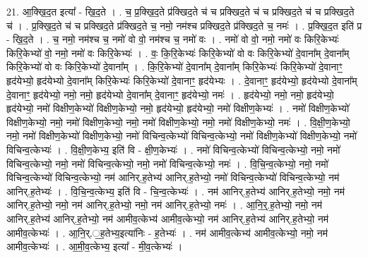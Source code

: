 \documentclass[17pt]{extarticle}
\begin{document}
21. आ॒क्खि॒द॒त इत्या᳚ - खि॒द॒ते । . च॒ प्र॒क्खि॒द॒ते प्र॑क्खिद॒ते च॑ च प्रक्खिद॒ते च॑ च प्रक्खिद॒ते च॑ च प्रक्खिद॒ते च॑ । . प्र॒क्खि॒द॒ते च॑ च प्रक्खिद॒ते प्र॑क्खिद॒ते च॒ नमो॒ नम॑श्च प्रक्खिद॒ते प्र॑क्खिद॒ते च॒ नमः॑ । . प्र॒क्खि॒द॒त इति॑ प्र - खि॒द॒ते । . च॒ नमो॒ नम॑श्च च॒ नमो॑ वो वो॒ नम॑श्च च॒ नमो॑ वः । . नमो॑ वो वो॒ नमो॒ नमो॑ वः किरि॒केभ्यः॑ किरि॒केभ्यो॑ वो॒ नमो॒ नमो॑ वः किरि॒केभ्यः॑ । . वः॒ कि॒रि॒केभ्यः॑ किरि॒केभ्यो॑ वो वः किरि॒केभ्यो॑ दे॒वाना᳚म् दे॒वाना᳚म् किरि॒केभ्यो॑ वो वः किरि॒केभ्यो॑ दे॒वाना᳚म् । . कि॒रि॒केभ्यो॑ दे॒वाना᳚म् दे॒वाना᳚म् किरि॒केभ्यः॑ किरि॒केभ्यो॑ दे॒वानाꣳ॒॒ हृद॑येभ्यो॒ हृद॑येभ्यो दे॒वाना᳚म् किरि॒केभ्यः॑ किरि॒केभ्यो॑ दे॒वानाꣳ॒॒ हृद॑येभ्यः । . दे॒वानाꣳ॒॒ हृद॑येभ्यो॒ हृद॑येभ्यो दे॒वाना᳚म् दे॒वानाꣳ॒॒ हृद॑येभ्यो॒ नमो॒ नमो॒ हृद॑येभ्यो दे॒वाना᳚म् दे॒वानाꣳ॒॒ हृद॑येभ्यो॒ नमः॑ । . हृद॑येभ्यो॒ नमो॒ नमो॒ हृद॑येभ्यो॒ हृद॑येभ्यो॒ नमो॑ विक्षीण॒केभ्यो॑ विक्षीण॒केभ्यो॒ नमो॒ हृद॑येभ्यो॒ हृद॑येभ्यो॒ नमो॑ विक्षीण॒केभ्यः॑ । . नमो॑ विक्षीण॒केभ्यो॑ विक्षीण॒केभ्यो॒ नमो॒ नमो॑ विक्षीण॒केभ्यो॒ नमो॒ नमो॑ विक्षीण॒केभ्यो॒ नमो॒ नमो॑ विक्षीण॒केभ्यो॒ नमः॑ । . वि॒क्षी॒ण॒केभ्यो॒ नमो॒ नमो॑ विक्षीण॒केभ्यो॑ विक्षीण॒केभ्यो॒ नमो॑ विचिन्व॒त्केभ्यो॑ विचिन्व॒त्केभ्यो॒ नमो॑ विक्षीण॒केभ्यो॑ विक्षीण॒केभ्यो॒ नमो॑ विचिन्व॒त्केभ्यः॑ । . वि॒क्षी॒ण॒केभ्य॒ इति॑ वि - क्षी॒ण॒केभ्यः॑ । . नमो॑ विचिन्व॒त्केभ्यो॑ विचिन्व॒त्केभ्यो॒ नमो॒ नमो॑ विचिन्व॒त्केभ्यो॒ नमो॒ नमो॑ विचिन्व॒त्केभ्यो॒ नमो॒ नमो॑ विचिन्व॒त्केभ्यो॒ नमः॑ । . वि॒चि॒न्व॒त्केभ्यो॒ नमो॒ नमो॑ विचिन्व॒त्केभ्यो॑ विचिन्व॒त्केभ्यो॒ नम॑ आनिर्.ह॒तेभ्य॑ आनिर्.ह॒तेभ्यो॒ नमो॑ विचिन्व॒त्केभ्यो॑ विचिन्व॒त्केभ्यो॒ नम॑ आनिर्.ह॒तेभ्यः॑ । . वि॒चि॒न्व॒त्केभ्य॒ इति॑ वि - चि॒न्व॒त्केभ्यः॑ । . नम॑ आनिर्.ह॒तेभ्य॑ आनिर्.ह॒तेभ्यो॒ नमो॒ नम॑ आनिर्.ह॒तेभ्यो॒ नमो॒ नम॑ आनिर्.ह॒तेभ्यो॒ नमो॒ नम॑ आनिर्.ह॒तेभ्यो॒ नमः॑ । . आ॒नि॒र्॒.ह॒तेभ्यो॒ नमो॒ नम॑ आनिर्.ह॒तेभ्य॑ आनिर्.ह॒तेभ्यो॒ नम॑ आमीव॒त्केभ्य॑ आमीव॒त्केभ्यो॒ नम॑ आनिर्.ह॒तेभ्य॑ आनिर्.ह॒तेभ्यो॒ नम॑ आमीव॒त्केभ्यः॑ । . आ॒नि॒र्.॒ह॒तेभ्य॒इत्या॑निः - ह॒तेभ्यः॑ । . नम॑ आमीव॒त्केभ्य॑ आमीव॒त्केभ्यो॒ नमो॒ नम॑ आमीव॒त्केभ्यः॑ । . आ॒मी॒व॒त्केभ्य॒ इत्या᳚ - मी॒व॒त्केभ्यः॑ । \newline
\pagebreak
{}
\end{document}
